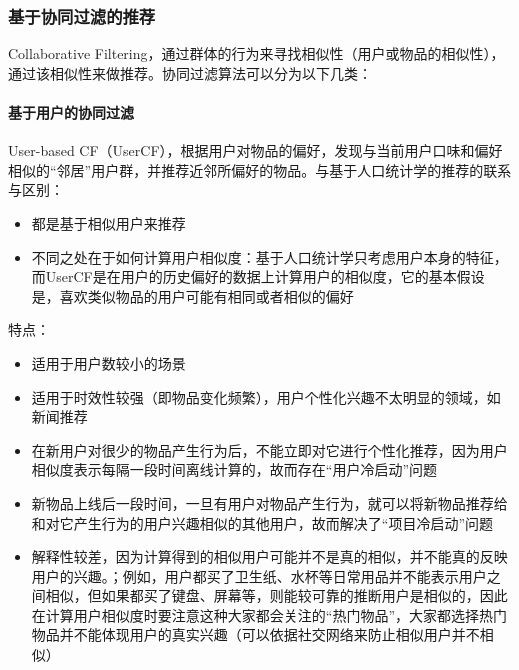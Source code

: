 \subsubsection{基于协同过滤的推荐}
Collaborative Filtering，通过群体的行为来寻找相似性（用户或物品的相似性），通过该相似性来做推荐。协同过滤算法可以分为以下几类：
\paragraph{基于用户的协同过滤}
User-based CF（UserCF），根据用户对物品的偏好，发现与当前用户口味和偏好相似的“邻居”用户群，并推荐近邻所偏好的物品。与基于人口统计学的推荐的联系与区别：
\begin{itemize}
	\item 都是基于相似用户来推荐
	\item 不同之处在于如何计算用户相似度：基于人口统计学只考虑用户本身的特征，而UserCF是在用户的历史偏好的数据上计算用户的相似度，它的基本假设是，喜欢类似物品的用户可能有相同或者相似的偏好
\end{itemize}
特点：
\begin{itemize}
	\item 适用于用户数较小的场景
	\item 适用于时效性较强（即物品变化频繁），用户个性化兴趣不太明显的领域，如新闻推荐
	\item 在新用户对很少的物品产生行为后，不能立即对它进行个性化推荐，因为用户相似度表示每隔一段时间离线计算的，故而存在“用户冷启动”问题
	\item 新物品上线后一段时间，一旦有用户对物品产生行为，就可以将新物品推荐给和对它产生行为的用户兴趣相似的其他用户，故而解决了“项目冷启动”问题
	\item 解释性较差，因为计算得到的相似用户可能并不是真的相似，并不能真的反映用户的兴趣。；例如，用户都买了卫生纸、水杯等日常用品并不能表示用户之间相似，但如果都买了键盘、屏幕等，则能较可靠的推断用户是相似的，因此在计算用户相似度时要注意这种大家都会关注的“热门物品”，大家都选择热门物品并不能体现用户的真实兴趣（可以依据社交网络来防止相似用户并不相似）
\end{itemize}


